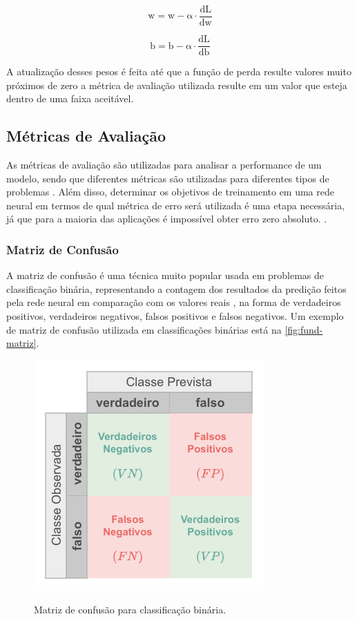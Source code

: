 \begin{equation} \label{eq:fund-atualizacao-w}
  \mathrm{
    w = w - \alpha \cdot \frac{dL}{dw}
  }
\end{equation}

\begin{equation} \label{eq:fund-atualizacao-b}
  \mathrm{
    b = b - \alpha \cdot \frac{dL}{db}
  }
\end{equation}

A atualização desses pesos é feita até que a função de perda resulte valores muito próximos de zero a métrica de avaliação utilizada resulte em um valor que esteja dentro de uma faixa aceitável.

\subsection{Métricas de Avaliação} \label{cap:fund-ia-metricas}
As métricas de avaliação são utilizadas para analisar a performance de um modelo, sendo que diferentes métricas são utilizadas para diferentes tipos de problemas \cite{ref:Srivastava}. Além disso, determinar os objetivos de treinamento em uma rede neural em termos de qual métrica de erro será utilizada é uma etapa necessária, já que para a maioria das aplicações é impossível obter erro zero absoluto. \cite{ref:Goodfellow-Bengio-Courville}.

\subsubsection{Matriz de Confusão} \label{cap:fund-ia-metricas-matriz}
A matriz de confusão é uma técnica muito popular usada em problemas de classificação binária, representando a contagem dos resultados da predição feitos pela rede neural em comparação com os valores reais \cite{ref:Batarseh-Yang}, na forma de verdadeiros positivos, verdadeiros negativos, falsos positivos e falsos negativos. Um exemplo de matriz de confusão utilizada em classificações binárias está na \autoref{fig:fund-matriz}.

\begin{figure}[H] %
  \centering
  \caption{Matriz de confusão para classificação binária.}
  \includegraphics[scale=1.1]{img/img-fundamentacao-matriz.pdf}
  \label{fig:fund-matriz}
\end{figure}

